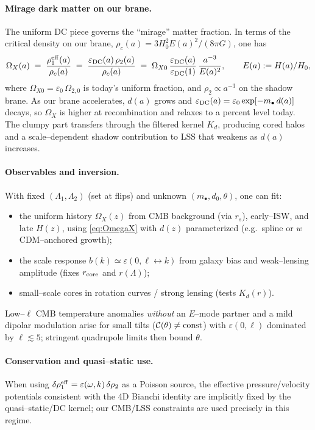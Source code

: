 \documentclass[10pt]{article}
\theoremstyle{definition}
\theoremstyle{plain}
\begin{document}
\paragraph{Mirage dark matter on our brane.}\label{par:uom-main-068}
The uniform DC piece governs the ``mirage'' matter fraction. In terms of the critical
density on our brane, $\rho_c(a)=3H_0^2 E(a)^2/(8\pi G)$, one has
\begin{equation}
\label{eq:OmegaX}
\Omega_X(a)\;=\;\frac{\rho^{\rm eff}_1(a)}{\rho_c(a)}
\;=\;\frac{\varepsilon_{\rm DC}(a)\,\rho_2(a)}{\rho_c(a)}
\;=\;\Omega_{X0}\,\frac{\varepsilon_{\rm DC}(a)}{\varepsilon_{\rm DC}(1)}\,
\frac{a^{-3}}{E(a)^2},\qquad E(a):=H(a)/H_0,
\end{equation}
where $\Omega_{X0}=\varepsilon_0\,\Omega_{2,0}$ is today’s uniform fraction, and
$\rho_2\propto a^{-3}$ on the shadow brane. As our brane accelerates, $d(a)$ grows and
$\varepsilon_{\rm DC}(a)=\varepsilon_0\exp[-m_\bullet\,d(a)]$ decays, so $\Omega_X$
is higher at recombination and relaxes to a percent level today. The clumpy part
transfers through the filtered kernel $K_d$, producing cored halos and a scale–dependent
shadow contribution to LSS that weakens as $d(a)$ increases.

\paragraph{Observables and inversion.}\label{par:uom-main-069}
With fixed $(\Lambda_1,\Lambda_2)$ (set at flips) and unknown $(m_\bullet,d_0,\theta)$,
one can fit:
\begin{itemize}[leftmargin=1.2em]
\item the uniform history $\Omega_X(z)$ from CMB background (via $r_s$), early–ISW, and
late $H(z)$, using \eqref{eq:OmegaX} with $d(z)$ parameterized (e.g.\ spline or
$w$CDM–anchored growth);
\item the scale response $b(k)\simeq \varepsilon(0,\ell\!\leftrightarrow\!k)$ from galaxy
bias and weak–lensing amplitude (fixes $r_{\rm core}$ and $r(\Lambda)$);
\item small–scale cores in rotation curves / strong lensing (tests $K_d(r)$).
\end{itemize}
Low–$\ell$ CMB temperature anomalies \emph{without} an $E$–mode partner and a mild
dipolar modulation arise for small tilts ($\mathcal C(\theta)\neq{\rm const}$) with
$\varepsilon(0,\ell)$ dominated by $\ell\lesssim5$; stringent quadrupole limits then
bound $\theta$.

\paragraph{Conservation and quasi–static use.}\label{par:uom-main-070}
When using $\delta\rho^{\rm eff}_1=\varepsilon(\omega,k)\,\delta\rho_2$ as a Poisson
source, the effective pressure/velocity potentials consistent with the 4D Bianchi
identity are implicitly fixed by the quasi–static/DC kernel; our CMB/LSS constraints are
used precisely in this regime.
\end{document}
